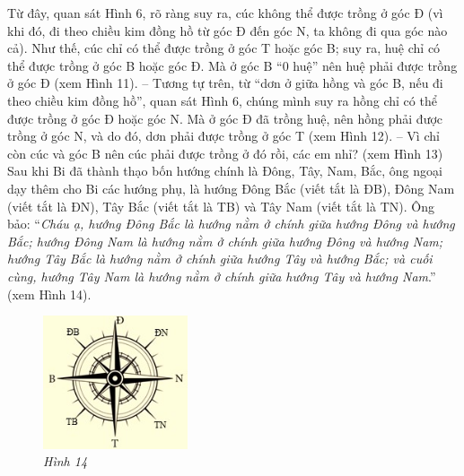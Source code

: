 	\vskip 0.1cm
	Từ đây, quan sát Hình 6, rõ ràng suy ra, cúc không thể được trồng ở góc Đ (vì khi đó, đi theo chiều kim đồng hồ từ góc Đ đến góc N, ta không đi qua góc nào cả). Như thế, cúc chỉ có thể được trồng ở góc T hoặc góc B; suy ra, huệ chỉ có thể được trồng ở góc B hoặc góc Đ. Mà ở góc B “0 huệ” nên huệ phải được trồng ở góc Đ (xem Hình 11).
	\vskip 0.1cm
	-- Tương tự trên, từ “dơn ở giữa hồng và góc B, nếu đi theo chiều kim đồng hồ”, quan sát Hình 6, chúng mình suy ra hồng chỉ có thể được trồng ở góc Đ hoặc góc N. Mà ở góc Đ đã trồng huệ, nên hồng phải được trồng ở góc N, và do đó, dơn phải được trồng ở góc T (xem Hình 12).
	\vskip 0.1cm
%			
	-- Vì chỉ còn cúc và góc B nên cúc phải được trồng ở đó rồi, các em nhỉ? (xem Hình 13)
	\vskip 0.1cm
	Sau khi Bi đã  thành thạo bốn hướng chính là Đông, Tây, Nam, Bắc, ông ngoại dạy thêm cho Bi các hướng phụ, là hướng Đông Bắc (viết tắt là ĐB), Đông Nam (viết tắt là ĐN), Tây Bắc (viết tắt là TB) và Tây Nam (viết tắt là TN). Ông bảo:
	\vskip 0.1cm
	“\textit{Cháu ạ, hướng Đông Bắc là hướng nằm ở chính giữa hướng Đông và hướng Bắc; hướng Đông Nam là hướng nằm ở chính giữa hướng Đông và hướng Nam; hướng Tây Bắc là hướng nằm ở chính giữa hướng Tây và hướng Bắc; và cuối cùng, hướng Tây Nam là hướng nằm ở chính giữa hướng Tây và hướng Nam}.” (xem Hình 14).
	\begin{figure}[H]
		\centering
		\captionsetup{labelformat= empty, justification=centering}
		\includegraphics[width=0.38\textwidth]{pic14}
		\caption{\small\textit{Hình 14}}
		\vspace*{-10pt}
	\end{figure}
